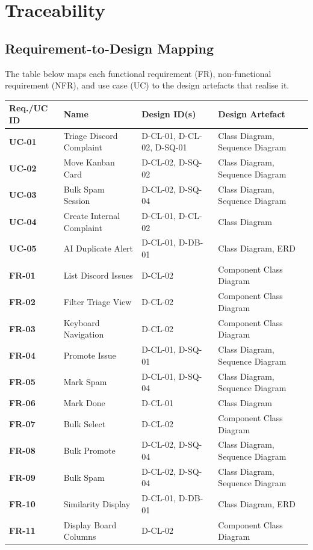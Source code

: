 \documentclass[12pt,a4paper]{report}
\begin{document}
\chapter{Traceability}

\section{Requirement-to-Design Mapping}

The table below maps each functional requirement (FR), non-functional
requirement (NFR), and use case (UC) to the design artefacts that realise it.

\begin{longtable}{>{\bfseries}p{2.2cm} p{4.5cm} p{3.5cm} p{3.5cm}}
\toprule
Req./UC ID & Name & Design ID(s) & Design Artefact \\
\midrule
\endhead
UC-01 & Triage Discord Complaint & D-CL-01, D-CL-02, D-SQ-01 & Class Diagram, Sequence Diagram \\
UC-02 & Move Kanban Card & D-CL-02, D-SQ-02 & Class Diagram, Sequence Diagram \\
UC-03 & Bulk Spam Session & D-CL-02, D-SQ-04 & Class Diagram, Sequence Diagram \\
UC-04 & Create Internal Complaint & D-CL-01, D-CL-02 & Class Diagram \\
UC-05 & AI Duplicate Alert & D-CL-01, D-DB-01 & Class Diagram, ERD \\
FR-01 & List Discord Issues & D-CL-02 & Component Class Diagram \\
FR-02 & Filter Triage View & D-CL-02 & Component Class Diagram \\
FR-03 & Keyboard Navigation & D-CL-02 & Component Class Diagram \\
FR-04 & Promote Issue & D-CL-01, D-SQ-01 & Class Diagram, Sequence Diagram \\
FR-05 & Mark Spam & D-CL-01, D-SQ-04 & Class Diagram, Sequence Diagram \\
FR-06 & Mark Done & D-CL-01 & Class Diagram \\
FR-07 & Bulk Select & D-CL-02 & Component Class Diagram \\
FR-08 & Bulk Promote & D-CL-02, D-SQ-04 & Class Diagram, Sequence Diagram \\
FR-09 & Bulk Spam & D-CL-02, D-SQ-04 & Class Diagram, Sequence Diagram \\
FR-10 & Similarity Display & D-CL-01, D-DB-01 & Class Diagram, ERD \\
FR-11 & Display Board Columns & D-CL-02 & Component Class Diagram \\

\end{longtable}
\end{document}
